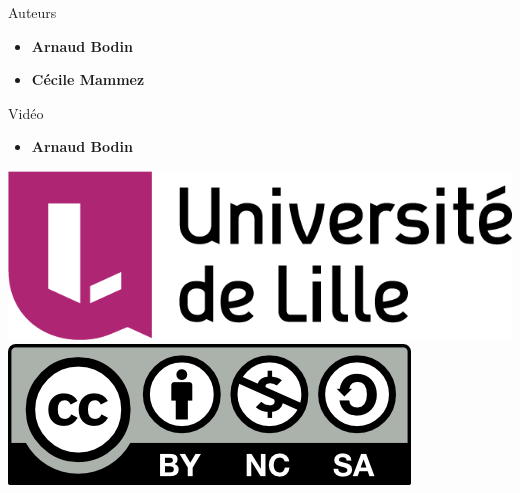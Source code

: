








\begin{frame}

\thispagestyle{empty}    

  \vspace*{-0cm}
  
  \hfill
  \begin{minipage}{0.4\textwidth}
  Auteurs
  \begin{itemize}
    \item {\bf Arnaud Bodin}
    \item {\bf Cécile Mammez}
  \end{itemize}
  Vidéo 
  \begin{itemize}
    \item {\bf Arnaud Bodin}
  \end{itemize}
  \end{minipage}  

\vfill


   \hfil
   \hspace*{1cm}
   \includegraphics[scale=0.13]{Logo-Univ-Lille} 
   \hfil   
   \hfil
   \includegraphics[scale=0.5]{by-nc-sa.png}



\end{frame}


